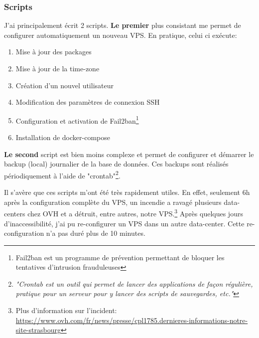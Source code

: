 \subsubsection{Scripts}
\label{scritps}
J'ai principalement écrit 2 scripts. \textbf{Le premier} plus consistant me permet de configurer automatiquement un nouveau VPS. En pratique, celui ci exécute: 
\begin{enumerate}
  \item Mise à jour des packages
  \item Mise à jour de la time-zone
  \item Création d'un nouvel utilisateur
  \item Modification des paramètres de connexion SSH
  \item Configuration et activation de Fail2ban\footnote{Fail2ban est un programme de prévention permettant de bloquer les tentatives d'intrusion frauduleuses}
  \item Installation de docker-compose
\end{enumerate}

\newpara

\textbf{Le second} script est bien moins complexe et permet de configurer et démarrer le backup (local) journalier de la base de données. Ces backups sont réalisés périodiquement à l'aide de "crontab"\footnote{\textit{"Crontab est un outil qui permet de lancer des applications de façon régulière, pratique pour un serveur pour y lancer des scripts de sauvegardes, etc."}\cite{CRON}}.

\newpara

Il s'avère que ces scripts m'ont été très rapidement utiles. En effet, seulement 6h après la configuration complète du VPS, un incendie a ravagé plusieurs data-centers chez OVH et a détruit, entre autres, notre VPS.\footnote{Plus d'information sur l'incident: \url{https://www.ovh.com/fr/news/presse/cpl1785.dernieres-informations-notre-site-strasbourg}} Après quelques jours d'inaccessibilité, j'ai pu re-configurer un VPS dans un autre data-center. Cette re-configuration n'a pas duré plus de 10 minutes.

\newpage


